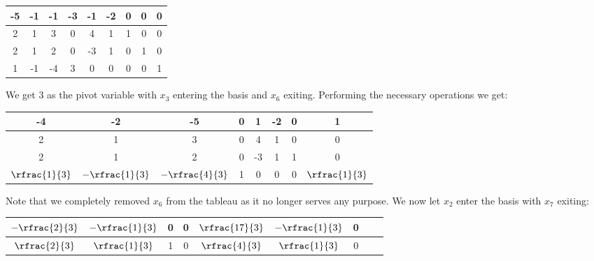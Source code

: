 \documentclass{article}
\begin{document}
\begin{jacklist}
    \begin{center}
        \begin{tabular}{|c|cccccccc|}
            \hline
            -5&-1&-1&-3&-1&-2&0&0&0\\
            \hline
            2&1&3&0&4&1&1&0&0\\
            2&1&2&0&-3&1&0&1&0\\
            1&-1&-4&3&0&0&0&0&1\\
            \hline
        \end{tabular}
    \end{center}
    We get 3 as the pivot variable with $x_3$ entering the basis and $x_6$ exiting. Performing the necessary operations we get:
    \begin{center}
        \begin{tabular}{|c|ccccccc|}
            \hline
            -4&-2&-5&0&1&-2&0&1\\
            \hline
            2&1&3&0&4&1&0&0\\
            2&1&2&0&-3&1&1&0\\
            $\rfrac{1}{3}$&$-\rfrac{1}{3}$&$-\rfrac{4}{3}$&1&0&0&0&$\rfrac{1}{3}$ \\
            \hline
        \end{tabular}
    \end{center}
    Note that we completely removed $x_6$ from the tableau as it no longer serves any purpose. We now let $x_2$ enter the basis with
    $x_7$ exiting: 
    \begin{center}
        \begin{tabular}{|c|cccccccc|}
            $-\rfrac{2}{3}$&$-\rfrac{1}{3}$&0&0&$\rfrac{17}{3}$&$-\rfrac{1}{3}$&0\\
            \hline
            $\rfrac{2}{3}$&$\rfrac{1}{3}$&1&0&$\rfrac{4}{3}$&$\rfrac{1}{3}$&0



\end{tabular}
\end{center}
\end{jacklist}
\end{document}
